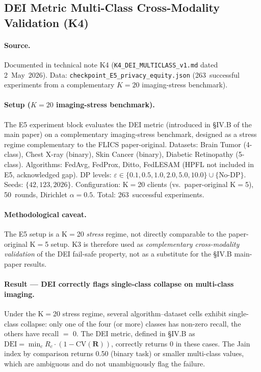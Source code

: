 \documentclass[conference]{IEEEtran}
\begin{document}
\subsection{DEI Metric Multi-Class Cross-Modality Validation (K4)}
\label{sec:pre_rebuttal_dei_xdom}

\paragraph{Source.} Documented in technical note K4 (\texttt{K4\_DEI\_MULTICLASS\_v1.md} dated 2~May~2026). Data: \texttt{checkpoint\_E5\_privacy\_equity.json} (263~successful experiments from a complementary $K{=}20$ imaging-stress benchmark).

\paragraph{Setup ($K{=}20$ imaging-stress benchmark).} The E5 experiment block evaluates the DEI metric (introduced in §IV.B of the main paper) on a complementary imaging-stress benchmark, designed as a stress regime complementary to the FLICS paper-original. Datasets: Brain Tumor (4-class), Chest X-ray (binary), Skin Cancer (binary), Diabetic Retinopathy (5-class). Algorithms: FedAvg, FedProx, Ditto, FedLESAM (HPFL not included in E5, acknowledged gap). DP levels: $\varepsilon\in\{0.1, 0.5, 1.0, 2.0, 5.0, 10.0\}\cup\{\text{No-DP}\}$. Seeds: $\{42, 123, 2026\}$. Configuration: K$=$20 clients (vs.\ paper-original K$=$5), 50~rounds, Dirichlet $\alpha{=}0.5$. Total: 263~successful experiments.

\paragraph{Methodological caveat.} The E5 setup is a K$=$20 \emph{stress} regime, not directly comparable to the paper-original K$=$5 setup. K3 is therefore used as \emph{complementary cross-modality validation} of the DEI fail-safe property, not as a substitute for the §IV.B main-paper results.

\paragraph{Result --- DEI correctly flags single-class collapse on multi-class imaging.} Under the K$=$20 stress regime, several algorithm--dataset cells exhibit single-class collapse: only one of the four (or more) classes has non-zero recall, the others have recall $=$ 0. The DEI metric, defined in §IV.B as $\text{DEI}{=}\min_c R_c \cdot (1 - \text{CV}(\mathbf{R}))$, correctly returns 0 in these cases. The Jain index by comparison returns 0.50 (binary task) or smaller multi-class values, which are ambiguous and do not unambiguously flag the failure.
\end{document}
